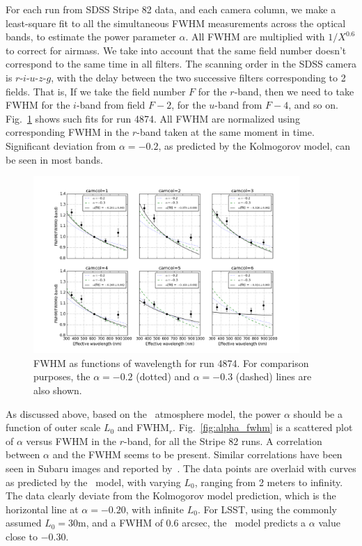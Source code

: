 For each run from SDSS Stripe 82 data, and each camera column, we make
a least-square fit to
all the simultaneous FWHM measurements across the optical bands, to
estimate the power parameter $\alpha$.
All FWHM are multiplied with $1/X^{0.6}$ to correct for airmass.
We take into account that the same field number doesn't correspond to the same
time in all filters. The scanning order in the SDSS camera is $r$-$i$-$u$-$z$-$g$, with the delay between the two 
successive filters corresponding to 2 fields. That is, If we take the field number $F$ for the $r$-band, then
we need to take FWHM for the $i$-band from field $F-2$, for the $u$-band
from $F-4$, and so on. Fig.~\ref{fig:fwhm_lambda} shows such fits for
run 4874. All FWHM are normalized using corresponding FWHM in the
$r$-band taken at the same moment in time.
Significant deviation from $\alpha = -0.2$, as predicted by the
Kolmogorov model, can be seen in most bands.

\begin{figure}
\centering
\includegraphics[width=0.9\textwidth]{FIGURES/fwhm_lambda.png}
\caption{FWHM as functions of wavelength for run 4874.
For comparison purposes, the $\alpha=-0.2$ (dotted) and $\alpha=-0.3$ (dashed) lines are
also shown.
\label{fig:fwhm_lambda}}
\end{figure}

As discussed above, based on the \vk~atmosphere model, the
power $\alpha$ should be a function of outer scale $L_0$ and %
FWHM$_r$. %
Fig.~\ref{fig:alpha_fwhm} is a scattered plot of $\alpha$ versus FWHM
in the $r$-band, for all the Stripe 82 runs.
A correlation between $\alpha$ and the FWHM seems to be present.
Similar correlations have been seen in Subaru images and reported by~\cite{subaruSeeing2016}.
The data points are overlaid with curves as predicted by the 
\vk~model, with varying $L_0$, ranging from 2 meters to infinity.
The data clearly deviate from the Kolmogorov model prediction, which is
the horizontal line at $\alpha = -0.20$, with infinite $L_0$.
For LSST, using the commonly assumed $L_0 = 30$m, and a FWHM of 0.6
arcsec, the \vk~model predicts a $\alpha$ value close to $-0.30$.

